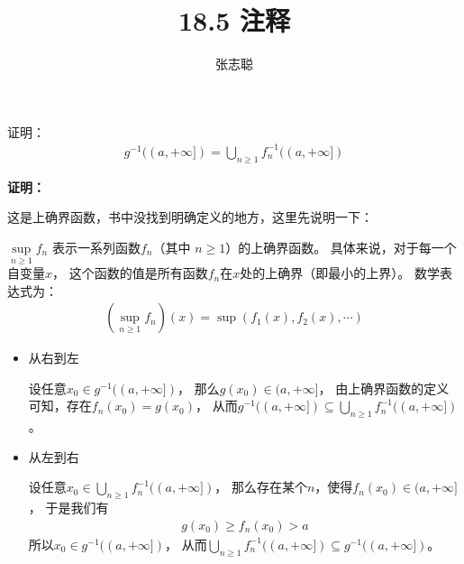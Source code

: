 \documentclass{article}
\begin{document}
\title{18.5 注释}
\author{张志聪}
\maketitle

\begin{zremark}
  证明：
  \begin{align*}
    g^{-1}((a, +\infty]) = \bigcup\limits_{n \geq 1} f_n^{-1}((a, +\infty])
  \end{align*}
\end{zremark}

\textbf{证明：}

这是上确界函数，书中没找到明确定义的地方，这里先说明一下：

$\sup\limits_{n \geq 1} f_n$ 表示一系列函数${f_n}$（其中 $n \geq 1$）的上确界函数。
具体来说，对于每一个自变量$x$，
这个函数的值是所有函数$f_n$在$x$处的上确界（即最小的上界）。
数学表达式为：
\begin{align*}
  \left( \sup\limits_{n \geq 1} f_n \right)(x) = \sup(f_1(x), f_2(x), \cdots)
\end{align*}

\begin{itemize}
  \item 从右到左

        设任意$x_0 \in g^{-1}((a, +\infty])$，
        那么$g(x_0) \in (a, +\infty]$，
        由上确界函数的定义可知，存在$f_n(x_0) = g(x_0)$，
        从而$g^{-1}((a, +\infty]) \subseteq \bigcup\limits_{n \geq 1} f_n^{-1}((a, +\infty])$。

  \item 从左到右

        设任意$x_0 \in \bigcup\limits_{n \geq 1} f_n^{-1}((a, +\infty])$，
        那么存在某个$n$，使得$f_n(x_0) \in (a, +\infty]$，
        于是我们有
        \begin{align*}
          g(x_0) \geq f_n(x_0) > a
        \end{align*}
        所以$x_0 \in g^{-1}((a, +\infty])$，
        从而$\bigcup\limits_{n \geq 1} f_n^{-1}((a, +\infty]) \subseteq g^{-1}((a, +\infty])$。
\end{itemize}
\end{document}
